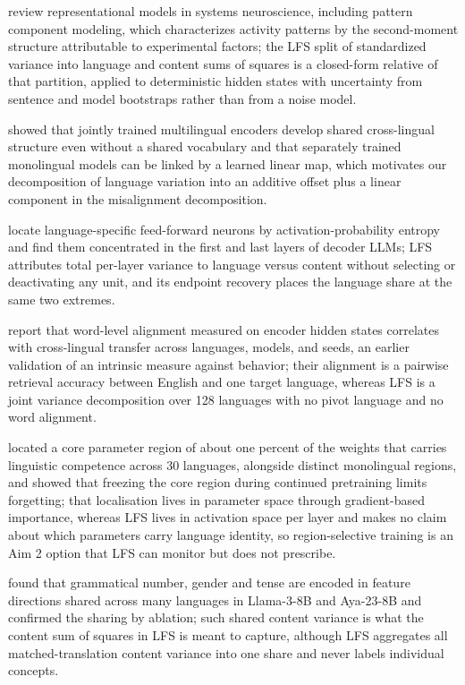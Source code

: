 \documentclass[11pt,a4paper]{article}
\begin{document}
\citet{kriegeskorte2019onion} review representational models in systems neuroscience, including pattern component modeling, which characterizes activity patterns by the second-moment structure attributable to experimental factors; the LFS split of standardized variance into language and content sums of squares is a closed-form relative of that partition, applied to deterministic hidden states with uncertainty from sentence and model bootstraps rather than from a noise model.

\citet{conneau2020emerging} showed that jointly trained multilingual encoders develop shared cross-lingual structure even without a shared vocabulary and that separately trained monolingual models can be linked by a learned linear map, which motivates our decomposition of language variation into an additive offset plus a linear component in the misalignment decomposition.

\citet{tang2024neurons} locate language-specific feed-forward neurons by activation-probability entropy and find them concentrated in the first and last layers of decoder LLMs; LFS attributes total per-layer variance to language versus content without selecting or deactivating any unit, and its endpoint recovery places the language share at the same two extremes.

\citet{gaschi2023alignment} report that word-level alignment measured on encoder hidden states correlates with cross-lingual transfer across languages, models, and seeds, an earlier validation of an intrinsic measure against behavior; their alignment is a pairwise retrieval accuracy between English and one target language, whereas LFS is a joint variance decomposition over 128 languages with no pivot language and no word alignment.

\citet{zhang2024regions} located a core parameter region of about one percent of the weights that carries linguistic competence across 30 languages, alongside distinct monolingual regions, and showed that freezing the core region during continued pretraining limits forgetting; that localisation lives in parameter space through gradient-based importance, whereas LFS lives in activation space per layer and makes no claim about which parameters carry language identity, so region-selective training is an Aim 2 option that LFS can monitor but does not prescribe.

\citet{brinkmann2025grammatical} found that grammatical number, gender and tense are encoded in feature directions shared across many languages in Llama-3-8B and Aya-23-8B and confirmed the sharing by ablation; such shared content variance is what the content sum of squares in LFS is meant to capture, although LFS aggregates all matched-translation content variance into one share and never labels individual concepts.
\end{document}
